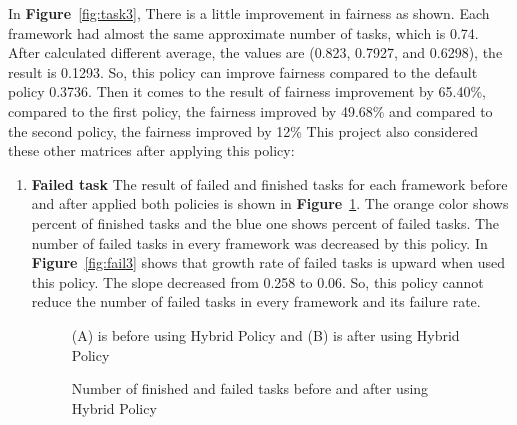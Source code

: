 \documentclass[12pt,oneside,openright,a4paper]{cpe-english-project}
\begin{document}
\hspace{10mm}In \textbf{Figure}~\ref{fig:task3}, There is a little improvement in fairness as shown. Each framework had almost the same approximate number of tasks, which is 0.74. After calculated different average, the values are (0.823, 0.7927, and 0.6298), the result is 0.1293. So, this policy can improve fairness compared to the default policy 0.3736. Then it comes to the result of fairness improvement by 65.40\%, compared to the first policy, the fairness improved by 49.68\% and compared to the second policy, the fairness improved by 12\%
\newline
This project also considered these other matrices after applying this policy: 
\begin{enumerate}
  \item \textbf{Failed task}
  \newline
  The result of failed and finished tasks for each framework before and after applied both policies is shown in  \textbf{Figure}~\ref{fig:finfail0-3}. The orange color shows percent of finished tasks and the blue one shows percent of failed tasks. The number of failed tasks in every framework was decreased by this policy. In \textbf{Figure}~\ref{fig:fail3} shows that growth rate of failed tasks is upward when used this policy. The slope decreased from 0.258 to 0.06. So, this policy cannot reduce the number of failed tasks in every framework and its failure rate.
  \begin{figure}[!h]\centering
    \setlength{\fboxrule}{0mm} %
    \setlength{\fboxsep}{0cm}
    \caption{Number of finished and failed tasks before and after using Hybrid Policy}\label{fig:finfail0-3}
    (A) is before using Hybrid Policy and (B) is  after using Hybrid Policy
\end{figure}
\begin{figure}[!h]\centering
    \setlength{\fboxrule}{0mm} %
    \setlength{\fboxsep}{0cm}

\end{figure}
\end{enumerate}
\end{document}
